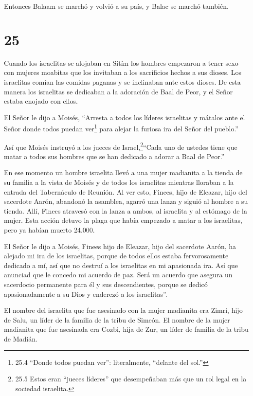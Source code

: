  Entonces Balaam se marchó y volvió a su país, y Balac se
marchó también.

\hypertarget{section-24}{%
\section{25}\label{section-24}}

 Cuando los israelitas se alojaban en Sitím los hombres
empezaron a tener sexo con mujeres moabitas  que los
invitaban a los sacrificios hechos a sus dioses. Los israelitas comían
las comidas paganas y se inclinaban ante estos dioses.  De
esta manera los israelitas se dedicaban a la adoración de Baal de Peor,
y el Señor estaba enojado con ellos.

 El Señor le dijo a Moisés, ``Arresta a todos los líderes
israelitas y mátalos ante el Señor donde todos puedan ver\footnote{25.4
  ``Donde todos puedan ver'': literalmente, ``delante del sol.''} para
alejar la furiosa ira del Señor del pueblo.''

 Así que Moisés instruyó a los jueces de
Israel,\footnote{25.5 Estos eran ``jueces líderes'' que desempeñaban más
  que un rol legal en la sociedad israelita.}``Cada uno de ustedes tiene
que matar a todos sus hombres que se han dedicado a adorar a Baal de
Peor.''

 En ese momento un hombre israelita llevó a una mujer
madianita a la tienda de su familia a la vista de Moisés y de todos los
israelitas mientras lloraban a la entrada del Tabernáculo de Reunión.
 Al ver esto, Finees, hijo de Eleazar, hijo del sacerdote
Aarón, abandonó la asamblea, agarró una lanza  y siguió al
hombre a su tienda. Allí, Finees atravesó con la lanza a ambos, al
israelita y al estómago de la mujer. Esta acción detuvo la plaga que
había empezado a matar a los israelitas,  pero ya habían
muerto 24.000.

 El Señor le dijo a Moisés,  Finees hijo de
Eleazar, hijo del sacerdote Aarón, ha alejado mi ira de los israelitas,
porque de todos ellos estaba fervorosamente dedicado a mí, así que no
destruí a los israelitas en mi apasionada ira.  Así que
anunciad que le concedo mi acuerdo de paz.  Será un acuerdo
que asegura un sacerdocio permanente para él y sus descendientes, porque
se dedicó apasionadamente a su Dios y enderezó a los israelitas''.

 El nombre del israelita que fue asesinado con la mujer
madianita era Zimri, hijo de Salu, un líder de la familia de la tribu de
Simeón.  El nombre de la mujer madianita que fue asesinada
era Cozbi, hija de Zur, un líder de familia de la tribu de Madián.

